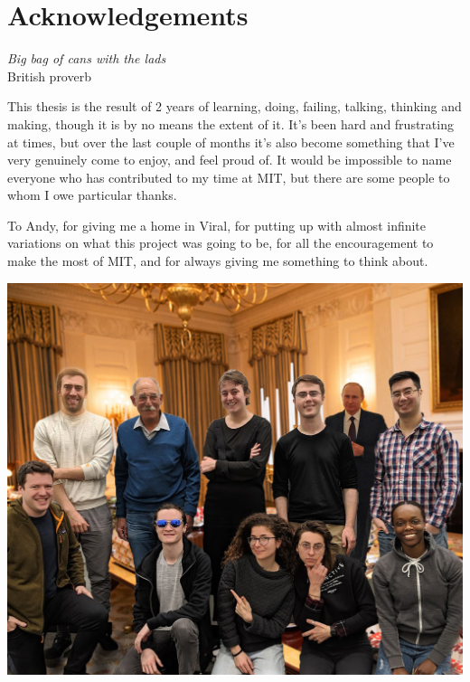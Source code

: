 \documentclass[nofonts,nols,justified,nobib]{tufte-book}
\begin{document}

\renewcommand{\thepage}{\roman{page}}



\newpage


\chapter*{Acknowledgements}

\begin{flushright}
\emph{Big bag of cans with the lads}\\
British proverb
\end{flushright}

This thesis is the result of 2 years of learning, doing, failing, talking, thinking and making, though it is by no means the extent of it. It's been hard and frustrating at times, but over the last couple of months it's also become something that I've very genuinely come to enjoy, and feel proud of. It would be impossible to name everyone who has contributed to my time at MIT, but there are some people to whom I owe particular thanks.

To Andy, for giving me a home in Viral, for putting up with almost infinite variations on what this project was going to be, for all the encouragement to make the most of MIT, and for always giving me something to think about. 

\begin{marginfigure}
\includegraphics[width=\textwidth]{img/1/viral.jpg}
\end{marginfigure}
\end{document}
